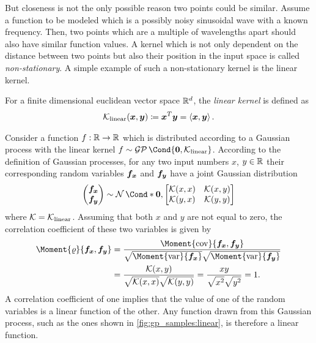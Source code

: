 But closeness is not the only possible reason two points could be similar.
Assume a function to be modeled which is a possibly noisy sinusoidal wave with a known frequency.
Then, two points which are a multiple of wavelengths apart should also have similar function values.
A kernel which is not only dependent on the distance between two points but also their position in the input space is called \emph{non-stationary}.
A simple example of such a non-stationary kernel is the linear kernel.
\begin{definition}
    For a finite dimensional euclidean vector space $\mathbb{R}^d$, the \emph{linear kernel} is defined as
    \begin{align}
        \operatorname{\mathcal{K}}_{\text{linear}}(\bm{x}, \bm{y}) \coloneqq \bm{x}^T \bm{y} = \left\langle \bm{x}, \bm{y}\right\rangle.
    \end{align}
\end{definition}
Consider a function $f : \mathbb{R} \to \mathbb{R}$ which is distributed according to a Gaussian process with the linear kernel $f \sim \GP\Cond{\mat{0}, \K_{\text{linear}}}$.
According to the definition of Gaussian processes, for any two input numbers $x$, $y \in \mathbb{R}$ their corresponding random variables $\bm{f_x}$ and $\bm{f_y}$ have a joint Gaussian distribution
\begin{align}
    \begin{pmatrix}
        \rv{f_x} \\ \rv{f_y}
    \end{pmatrix} \sim \Gaussian*{\mat{0}, \begin{bmatrix}
        \K(x, x) & \K(x, y) \\
        \K(y, x) & \K(y, y)
    \end{bmatrix}}
\end{align}
where $\operatorname{\mathcal{K}} = \operatorname{\mathcal{K}}_{\text{linear}}$.
Assuming that both $x$ and $y$ are not equal to zero, the correlation coefficient of these two variables is given by
\begin{align}
    \Moment{\corr}{\rv{f_x}, \rv{f_y}} &= \frac{\Moment{\cov}{\rv{f_x}, \rv{f_y}}}{\sqrt{\Moment{\var}{\rv{f_x}\vphantom{\rv{f_y}}}}\sqrt{\Moment{\var}{\rv{f_y}}}} \\
    &= \frac{\K(x, y)}{\sqrt{\K(x, x)} \sqrt{\K(y, y)}} = \frac{xy}{\sqrt{\vphantom{y^2}x^2}\sqrt{\vphantom{y^2}y^2}} = 1.
\end{align}
A correlation coefficient of one implies that the value of one of the random variables is a linear function of the other.
Any function drawn from this Gaussian process, such as the ones shown in \cref{fig:gp_samples:linear}, is therefore a linear function.
